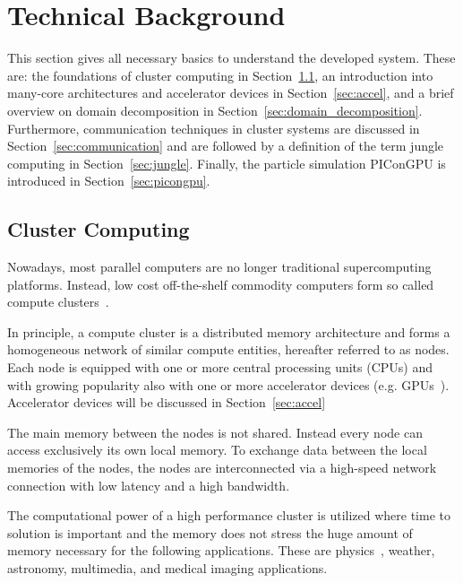 \section{Technical Background}
\label{sec:technical_background}
This section gives all necessary basics to understand the developed
system.  These are: the foundations of cluster computing in
Section~\ref{sec:cluster}, an introduction into many-core
architectures and accelerator devices in Section~\ref{sec:accel}, and
a brief overview on domain decomposition in
Section~\ref{sec:domain_decomposition}. Furthermore, communication
techniques in cluster systems are discussed in
Section~\ref{sec:communication} and are followed by a definition of
the term jungle computing in Section~\ref{sec:jungle}. Finally, the
particle simulation PIConGPU is introduced in
Section~\ref{sec:picongpu}.

\subsection{Cluster Computing}
\label{sec:cluster}
Nowadays, most parallel computers are no longer traditional
supercomputing platforms. Instead, low cost off-the-shelf commodity
computers form so called compute clusters~\cite{ref:hpcc1}.

In principle, a compute cluster is a distributed memory architecture
and forms a homogeneous network of similar compute entities, hereafter
referred to as nodes. Each node is equipped with one or more central
processing units (CPUs) and with growing popularity also with one or
more accelerator devices (e.g. GPUs~\cite{ref:accel}). Accelerator
devices will be discussed in Section~\ref{sec:accel}

The main memory between the nodes is not shared. Instead every node
can access exclusively its own local memory.  To exchange data between
the local memories of the nodes, the nodes are interconnected via a
high-speed network connection with low latency and a high bandwidth.

The computational power of a high performance cluster is utilized
where time to solution is important and the memory does not stress the
huge amount of memory necessary for the following applications. These
are physics~\cite{ref:picongpu}, weather, astronomy, multimedia, and
medical imaging applications.


